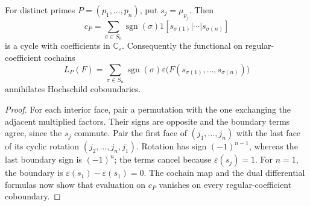 \begin{lemma}
\label{v4-arith:bc:gauge-cycles}
For distinct primes \(P=(p_1,\ldots,p_n)\), put \(s_j=\mu_{p_j}\).
Then
\[
 c_P=\sum_{\sigma\in S_n}\operatorname{sgn}(\sigma)
           1[s_{\sigma(1)}|\cdots|s_{\sigma(n)}]
\]
is a cycle with coefficients in \(\mathbb C_\varepsilon\).
Consequently the functional on regular-coefficient cochains
\[
 L_P(F)=\sum_{\sigma\in S_n}\operatorname{sgn}(\sigma)
 \varepsilon\bigl(F(s_{\sigma(1)},\ldots,s_{\sigma(n)})\bigr)
\]
annihilates Hochschild coboundaries.
\end{lemma}
\begin{proof}
For each interior face, pair a permutation with the one exchanging
the adjacent multiplied factors. Their signs are opposite and the
boundary terms agree, since the \(s_j\) commute. Pair the first face
of \((j_1,\ldots,j_n)\) with the last face of its cyclic rotation
\((j_2,\ldots,j_n,j_1)\). Rotation has sign \((-1)^{n-1}\),
whereas the last boundary sign is \((-1)^n\); the terms cancel
because \(\varepsilon(s_j)=1\). For \(n=1\), the boundary is
\(\varepsilon(s_1)-\varepsilon(s_1)=0\).
The cochain map and the dual differential formulas now show that
evaluation on \(c_P\) vanishes on every regular-coefficient coboundary.
\end{proof}

